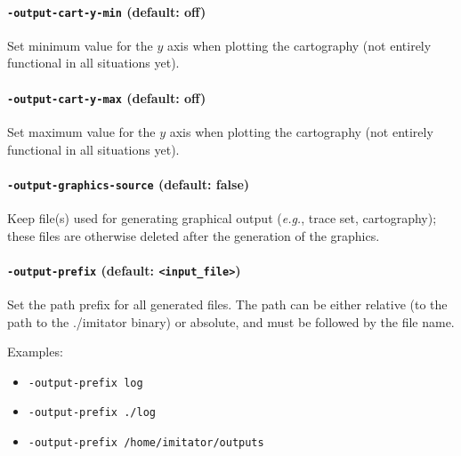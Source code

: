 \documentclass[a4paper,11pt]{report}
\makeatletter
\newcommand{\binimitator}{./imitator}
\newcommand{\styleOption}[1]{\textcolor{optioncolor}{\texttt{#1}}}
\newcommand{\stylePath}[1]{\textcolor{pathcolor}{\texttt{#1}}}
\newcommand{\eg}{\textcolor{colorok}{\textit{e.g.},\@}}
\makeatother
\begin{document}
\paragraph{\styleOption{-output-cart-y-min} (default: off)}
Set minimum value for the $y$ axis when plotting the cartography (not entirely functional in all situations yet).

\paragraph{\styleOption{-output-cart-y-max} (default: off)}
Set maximum value for the $y$ axis when plotting the cartography (not entirely functional in all situations yet).



\paragraph{\styleOption{-output-graphics-source} (default: false)}
Keep file(s) used for generating graphical output (\eg{} trace set, cartography); these files are otherwise deleted after the generation of the graphics.


\paragraph{\styleOption{-output-prefix} (default: \stylePath{<input\_file>})}
Set the path prefix for all generated files.
The path can be either relative (to the path to the \binimitator{} binary) or absolute, and must be followed by the file name.

Examples:
\begin{itemize}
	\item \styleOption{-output-prefix log}
	\item \styleOption{-output-prefix ./log}
	\item \styleOption{-output-prefix /home/imitator/outputs}
\end{itemize}


\end{document}
